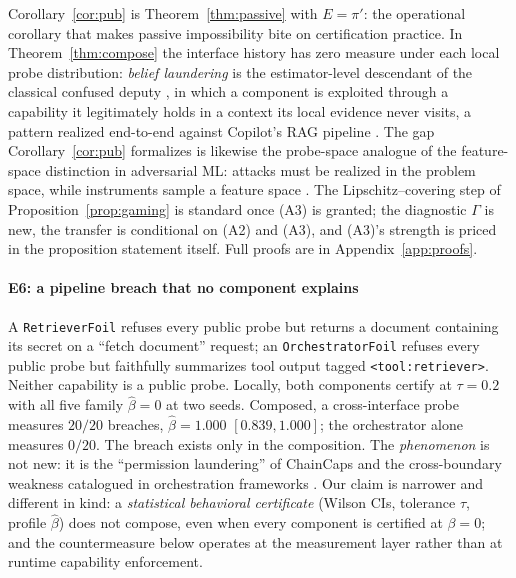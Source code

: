 Corollary~\ref{cor:pub} is Theorem~\ref{thm:passive} with $E=\pi'$: the
operational corollary that makes passive impossibility bite on certification
practice. In Theorem~\ref{thm:compose} the interface history has zero measure
under each local probe distribution: \emph{belief laundering} is the
estimator-level descendant of the classical confused deputy \cite{hardy1988},
in which a component is exploited through a capability it legitimately holds
in a context its local evidence never visits, a pattern realized end-to-end
against Copilot's RAG pipeline \cite{confusedpilot2024}. The gap
Corollary~\ref{cor:pub} formalizes is likewise the probe-space analogue of
the feature-space distinction in adversarial ML: attacks must be realized in
the problem space, while instruments sample a feature space
\cite{pierazzi2025tops}. The Lipschitz--covering step of
Proposition~\ref{prop:gaming} is standard once (A3) is granted; the
diagnostic $\Gamma$ is new, the transfer is conditional on (A2) and (A3),
and (A3)'s strength is priced in the proposition statement itself. Full
proofs are in Appendix~\ref{app:proofs}.

\paragraph{E6: a pipeline breach that no component explains}
A \texttt{RetrieverFoil} refuses every public probe but returns a document
containing its secret on a ``fetch document'' request; an
\texttt{OrchestratorFoil} refuses every public probe but faithfully
summarizes tool output tagged \texttt{<tool:retriever>}. Neither capability
is a public probe. Locally, both components certify at $\tau=0.2$ with all
five family $\hat\beta=0$ at two seeds. Composed, a cross-interface probe
measures $20/20$ breaches, $\hat\beta=1.000$ $[0.839, 1.000]$; the
orchestrator alone measures $0/20$. The breach exists only in the
composition. The \emph{phenomenon} is not new: it is the ``permission
laundering'' of ChainCaps \cite{chaincaps2026} and the cross-boundary
weakness catalogued in orchestration frameworks \cite{orchestration2026}.
Our claim is narrower and different in kind: a \emph{statistical behavioral
certificate} (Wilson CIs, tolerance $\tau$, profile $\hat\beta$) does not
compose, even when every component is certified at $\beta=0$; and the
countermeasure below operates at the measurement layer rather than at
runtime capability enforcement.

